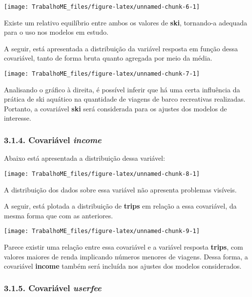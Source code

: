 \documentclass[
]{article}
\begin{document}
\begin{center}\texttt{[image: TrabalhoME\_files/figure-latex/unnamed-chunk-6-1]} \end{center}

Existe um relativo equilíbrio entre ambos os valores de \textbf{ski},
tornando-a adequada para o uso nos modelos em estudo.

A seguir, está apresentada a distribuição da variável resposta em função
dessa covariável, tanto de forma bruta quanto agregada por meio da
média.

\begin{center}\texttt{[image: TrabalhoME\_files/figure-latex/unnamed-chunk-7-1]} \end{center}

Analisando o gráfico à direita, é possível inferir que há uma certa
influência da prática de ski aquático na quantidade de viagens de barco
recreativas realizadas. Portanto, a covariável \textbf{ski} será
considerada para os ajustes dos modelos de interesse.

\subsubsection{\texorpdfstring{3.1.4. Covariável
\emph{income}}{3.1.4. Covariável income}}\label{covariuxe1vel-income}

Abaixo está apresentada a distribuição dessa variável:

\begin{center}\texttt{[image: TrabalhoME\_files/figure-latex/unnamed-chunk-8-1]} \end{center}

A distribuição dos dados sobre essa variável não apresenta problemas
visíveis.

A seguir, está plotada a distribuição de \textbf{trips} em relação a
essa covariável, da mesma forma que com as anteriores.

\begin{center}\texttt{[image: TrabalhoME\_files/figure-latex/unnamed-chunk-9-1]} \end{center}

Parece existir uma relação entre essa covariável e a variável resposta
\textbf{trips}, com valores maiores de renda implicando números menores
de viagens. Dessa forma, a covariável \textbf{income} também será
incluída nos ajustes dos modelos considerados.

\subsubsection{\texorpdfstring{3.1.5. Covariável
\emph{userfee}}{3.1.5. Covariável userfee}}\label{covariuxe1vel-userfee}
\end{document}
